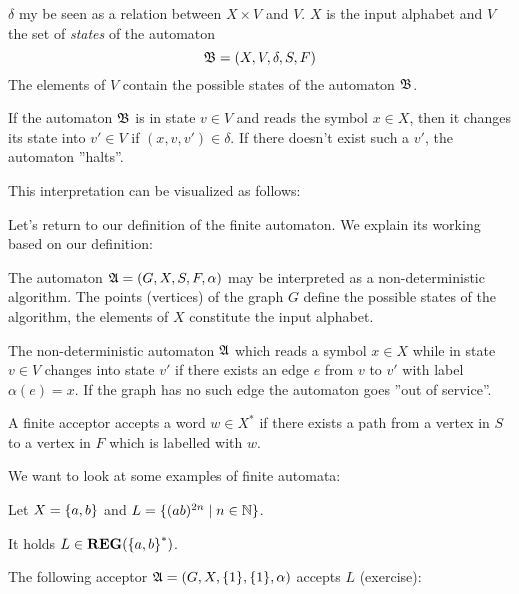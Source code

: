 $\delta$ my be seen as a relation between $X \times V$ and $V$. $X$ is
the input alphabet and $V$ the set of {\em states} of the automaton
\[ \mbox{$\mathfrak{B}$} = (X, V, \delta, S, F) \]
The elements of $V$ contain the possible states of the automaton $\mbox{$\mathfrak{B}$}$.

If the automaton $\mbox{$\mathfrak{B}$}$ is in state $v \in V$ and reads the symbol $x
\in X$, then it changes its state into $v' \in V$ if $(x, v, v') \in \delta$. If
there doesn't exist such a $v'$, the automaton ''halts''.

This interpretation can be visualized as follows:

\begin{center}

\end{center}

Let's return to our definition of the finite automaton. We explain its working
based on our definition:

The automaton $\mbox{$\mathfrak{A}$} = (G, X, S, F, \alpha)$ may be interpreted as a
non-deterministic algorithm. The points (vertices) of the graph $G$ define the
possible states of the algorithm, the elements of $X$ constitute the input
alphabet.

The non-deterministic automaton $\mbox{$\mathfrak{A}$}$ which reads a symbol $x \in X$
while in state $v \in V$ changes into state $v'$ if there exists an edge $e$
from $v$ to $v'$ with label $\alpha(e) = x$. If the graph has no such edge the
automaton goes ''out of service''.

A finite acceptor accepts a word $w \in X^*$ if there exists a path from a
vertex in $S$ to a vertex in $F$ which is labelled with $w$.

We want to look at some examples of finite automata:
\begin{example}
Let $X = \mbox{$\{a, b\}$}$ and $L = \mbox{$\{(a b)^{2n} \mid n \in \mathbb{N}\}$}$.

It holds $L \in \mbox{{\bf REG}}(\mbox{$\{a, b\}$}^*)$.

The following acceptor $\mbox{$\mathfrak{A}$} = (G, X, \mbox{$\{1\}$}, \mbox{$\{1\}$}, \alpha)$ accepts
$L$ (exercise):

\begin{center}

\end{center}
\end{example}


